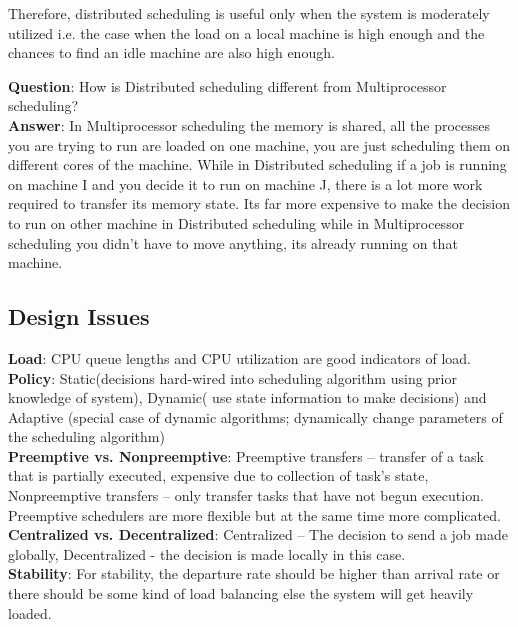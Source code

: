 \documentclass[twoside]{article}
\begin{document}
Therefore, distributed scheduling is useful only when the system is moderately utilized i.e. the case when the load on a local machine is high enough and the chances to find an idle machine are also high enough.

\textbf{Question}: How is Distributed scheduling different from Multiprocessor scheduling?\\
\textbf{Answer}: In Multiprocessor scheduling the memory is shared, all the processes you are trying to run are loaded on one machine, you are just scheduling them on different cores of the machine. While in Distributed scheduling if a job is running on machine I and you decide it to run on machine J, there is a lot more work required to transfer its memory state. Its far more expensive to make the decision to run on other machine in Distributed scheduling while in Multiprocessor scheduling you didn't have to move anything, its already running on that machine.  \\

\subsection{Design Issues}
{\bf Load}: CPU queue lengths and CPU utilization are good indicators of load.\\
{\bf Policy}: Static(decisions hard-wired into scheduling algorithm using prior knowledge of system), Dynamic( use state information to make decisions) and  Adaptive (special case of dynamic algorithms; dynamically change parameters of the scheduling algorithm)\\
{\bf Preemptive vs. Nonpreemptive}: Preemptive transfers -- transfer of a task that is partially executed, expensive due to collection of task's state, Nonpreemptive transfers -- only transfer tasks that have not begun execution. Preemptive schedulers are more flexible but at the same time more complicated. \\
{\bf Centralized vs. Decentralized}: Centralized -- The decision to send a job made globally, Decentralized - the decision is made locally in this case.\\
{\bf Stability}: For stability, the departure rate should be higher than arrival rate or there should be some kind of load balancing else the system will get heavily loaded.
\end{document}
